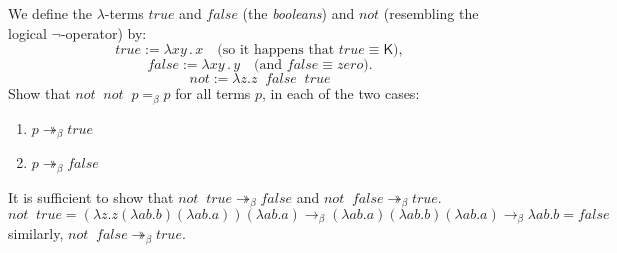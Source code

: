 \begin{problem}{1.12}
    We define the \(\lambda\)-terms \(\mathit{true}\) and \(\mathit{false}\) (the \emph{booleans}) and \(\mathit{not}\) (resembling the logical \(\neg\)-operator) by:
    $$ \mathit{true} := \lambda xy\,.\, x \quad \text{(so it happens that } \mathit{true} \equiv \mathsf{K}), $$
    $$ \mathit{false} := \lambda xy\,.\, y \quad \text{(and } \mathit{false} \equiv \mathit{zero}). $$
    $$ \mathit{not} := \lambda z.z \;\; false \;\; true $$
    Show that $not \;\; not \;\; p =_\beta p$ for all terms $p$, in each of the two cases:
    \begin{enumerate}[label=$(\alph*)$]
        \item $p \twoheadrightarrow_\beta true$
        \item $p \twoheadrightarrow_\beta false$
    \end{enumerate}
\end{problem}

\begin{solution}
    It is sufficient to show that $not \;\; true \twoheadrightarrow_\beta false$ and $not \;\; false \twoheadrightarrow_\beta true$.
    $$ not \;\; true = (\lambda z.z (\lambda ab.b) (\lambda ab.a)) (\lambda ab.a) \to_\beta (\lambda ab.a)(\lambda ab.b)(\lambda ab.a) \to_\beta \lambda ab.b = false $$
    similarly, $not \;\; false \twoheadrightarrow_\beta true$.
\end{solution}